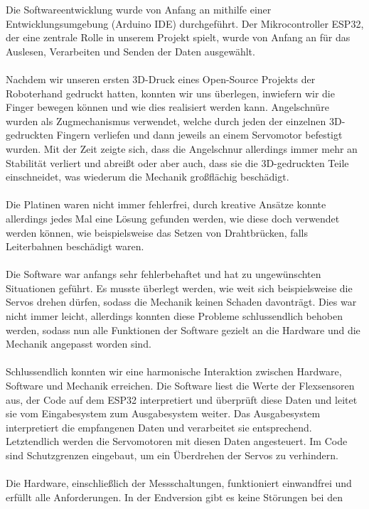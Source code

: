 \documentclass[titlepage,12pt,twoside]{article}
\begin{document}
Die Softwareentwicklung wurde von Anfang an mithilfe einer Entwicklungsumgebung 
(Arduino IDE) durchgeführt. Der Mikrocontroller ESP32, der eine zentrale Rolle 
in unserem Projekt spielt, wurde von Anfang an für das Auslesen, Verarbeiten 
und Senden der Daten ausgewählt. \\
\\
Nachdem wir unseren ersten 3D-Druck eines Open-Source Projekts der Roboterhand 
gedruckt hatten, konnten wir uns überlegen, inwiefern wir die Finger bewegen 
können und wie dies realisiert werden kann. Angelschnüre wurden als Zugmechanismus 
verwendet, welche durch jeden der einzelnen 3D-gedruckten Fingern verliefen 
und dann jeweils an einem Servomotor befestigt wurden. Mit der Zeit zeigte 
sich, dass die Angelschnur allerdings immer mehr an Stabilität verliert und 
abreißt oder aber auch, dass sie die 3D-gedruckten Teile einschneidet, was 
wiederum die Mechanik großflächig beschädigt. \\
\\
Die Platinen waren nicht immer fehlerfrei, durch kreative Ansätze konnte 
allerdings jedes Mal eine Lösung gefunden werden, wie diese doch verwendet 
werden können, wie beispielsweise das Setzen von Drahtbrücken, falls 
Leiterbahnen beschädigt waren. \\
\\
Die Software war anfangs sehr fehlerbehaftet und hat zu ungewünschten 
Situationen geführt. Es musste überlegt werden, wie weit sich beispielsweise 
die Servos drehen dürfen, sodass die Mechanik keinen Schaden davonträgt. Dies 
war nicht immer leicht, allerdings konnten diese Probleme schlussendlich 
behoben werden, sodass nun alle Funktionen der Software gezielt an die Hardware 
und die Mechanik angepasst worden sind. \\
\\
Schlussendlich konnten wir eine harmonische Interaktion zwischen Hardware, 
Software und Mechanik erreichen. Die Software liest die Werte der Flexsensoren 
aus, der Code auf dem ESP32 interpretiert und überprüft diese Daten und leitet 
sie vom Eingabesystem zum Ausgabesystem weiter. Das Ausgabesystem interpretiert 
die empfangenen Daten und verarbeitet sie entsprechend. Letztendlich werden 
die Servomotoren mit diesen Daten angesteuert. Im Code sind Schutzgrenzen eingebaut, 
um ein Überdrehen der Servos zu verhindern. \\
\\
Die Hardware, einschließlich der Messschaltungen, funktioniert einwandfrei und 
erfüllt alle Anforderungen. In der Endversion gibt es keine Störungen bei den 
\end{document}
